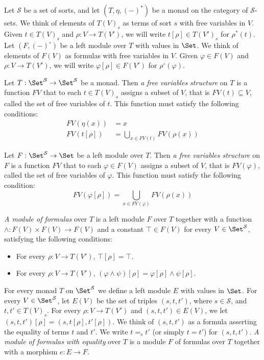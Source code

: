 Let $\mathcal{S}$ be a set of sorts, and let $(T,\eta,(-)^*)$ be a monad on the category of $\mathcal{S}$-sets.
We think of elements of $T(V)_s$ as terms of sort $s$ with free variables in $V$.
Given $t \in T(V)_s$ and $\rho : V \to T(V')$, we will write $t[\rho] \in T(V')_s$ for $\rho^*(t)$.
Let $(F,(-)^\circ)$ be a left module over $T$ with values in $\Set$.
We think of elements of $F(V)$ as formulas with free variables in $V$.
Given $\varphi \in F(V)$ and $\rho : V \to T(V')$, we will write $\varphi[\rho] \in F(V')$ for $\rho^\circ(\varphi)$.

Let $T : \Set^\mathcal{S} \to \Set^\mathcal{S}$ be a monad.
Then \emph{a free variables structure} on $T$ is a function $FV$ that to each $t \in T(V)_s$ assigns a subset of $V$, that is $FV(t) \subseteq V$, called the set of free variables of $t$.
This function must satisfy the following conditions:
\begin{align*}
FV(\eta(x)) & = x \\
FV(t[\rho]) & = \bigcup_{x \in FV(t)} FV(\rho(x))
\end{align*}

Let $F : \Set^\mathcal{S} \to \Set$ be a left module over $T$.
Then \emph{a free variables structure} on $F$ is a function $FV$ that to each $\varphi \in F(V)$ assigns a subset of $V$, that is $FV(\varphi)$, called the set of free variables of $\varphi$.
This function must satisfy the following condition:
\[ FV(\varphi[\rho]) = \bigcup_{x \in FV(\varphi)} FV(\rho(x)) \]

\emph{A module of formulas} over $T$ is a left module $F$ over $T$ together with a function
    $\land : F(V) \times F(V) \to F(V)$ and a constant $\top \in F(V)$ for every $V \in \Set^\mathcal{S}$, satisfying the following conditions:
\begin{itemize}
\item For every $\rho : V \to T(V')$, $\top[\rho] = \top$.
\item For every $\rho : V \to T(V')$, $(\varphi \land \psi)[\rho] = \varphi[\rho] \land \psi[\rho]$.
\end{itemize}

For every monad $T$ on $\Set^\mathcal{S}$ we define a left module $E$ with values in $\Set$.
For every $V \in \Set^\mathcal{S}$, let $E(V)$ be the set of triples $(s,t,t')$, where $s \in \mathcal{S}$, and $t,t' \in T(V)_s$.
For every $\rho : V \to T(V')$ and $(s,t,t') \in E(V)$, we let $(s,t,t')[\rho] = (s,t[\rho],t'[\rho])$.
We think of $(s,t,t')$ as a formula asserting the equality of terms $t$ and $t'$.
We write $t =_s t'$ (or simply $t = t'$) for $(s,t,t')$.
\emph{A module of formulas with equality} over $T$ is a module $F$ of formulas over $T$ together with a morphism $e : E \to F$.

